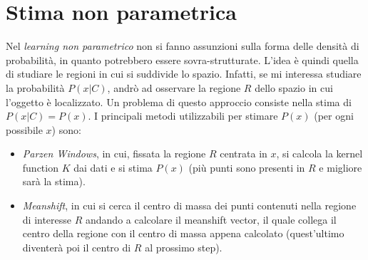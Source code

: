 \documentclass[a4paper,oneside,titlepage]{book}
\begin{document}
\section{Stima non parametrica}
Nel \textit{learning non parametrico} non si fanno assunzioni sulla forma delle densità di probabilità, in quanto potrebbero essere sovra-strutturate. L'idea è quindi quella di studiare le regioni in cui si suddivide lo spazio. Infatti, se mi interessa studiare la probabilità $P(x|C)$, andrò ad osservare la regione $R$ dello spazio in cui l'oggetto è localizzato. Un problema di questo approccio consiste nella stima di $P(x|C) = P(x)$. I principali metodi utilizzabili per stimare $P(x)$ (per ogni possibile $x$) sono:
\begin{itemize}
    \item \textit{Parzen Windows}, in cui, fissata la regione $R$ centrata in $x$, si calcola la kernel function $K$ dai dati e si stima $P(x)$ (più punti sono presenti in $R$ e migliore sarà la stima).
    \item \textit{Meanshift}, in cui si cerca il centro di massa dei punti contenuti nella regione di interesse $R$ andando a calcolare il meanshift vector, il quale collega il centro della regione con il centro di massa appena calcolato (quest'ultimo diventerà poi il centro di $R$ al prossimo step).
\end{itemize}
\end{document}
